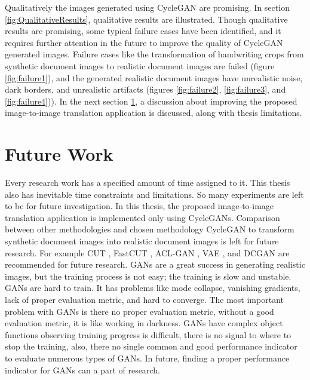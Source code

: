 Qualitatively the images generated using \ac{CycleGAN} are promising. In section \ref{fig:QualitativeResults}, qualitative results are illustrated. Though qualitative results are promising, some typical failure cases have been identified, and it requires further attention in the future to improve the quality of \ac{CycleGAN} generated images. Failure cases like the transformation of handwriting crops from synthetic document images to realistic document images are failed (figure \ref{fig:failure1}), and the generated realistic document images have unrealistic noise, dark borders, and unrealistic artifacts (figures \ref{fig:failure2}, \ref{fig:failure3}, and \ref{fig:failure4})). In the next section \ref{FutureWork}, a discussion about improving the proposed image-to-image translation application is discussed, along with thesis limitations.


\section{Future Work}\label{FutureWork}

Every research work has a specified amount of time assigned to it. This thesis also has inevitable time constraints and limitations. So many experiments are left to be for future investigation. In this thesis, the proposed image-to-image translation application is implemented only using \acp{CycleGAN}. Comparison between other methodologies and chosen methodology \ac{CycleGAN} to transform synthetic document images into realistic document images is left for future research. For example \ac{CUT} \cite{park2020contrastive}, \ac{FastCUT} \cite{park2020contrastive}, \ac{ACL-GAN} \cite{zhao2021unpaired}, \ac{VAE} \cite{Kingma_2019}, and \ac{DCGAN} \cite{radford2016unsupervised} are recommended for future research. \acp{GAN} are a great success in generating realistic images, but the training process is not easy; the training is slow and unstable. \acp{GAN} are hard to train. It has problems like mode collapse, vanishing gradients, lack of proper evaluation metric, and hard to converge. The most important problem with \acp{GAN} is there no proper evaluation metric, without a good evaluation metric, it is like working in darkness. \acp{GAN} have complex object functions observing training progress is difficult, there is no signal to where to stop the training, also, there no single common and good performance indicator to evaluate numerous types of \acp{GAN}. In future, finding a proper performance indicator for \acp{GAN} can a part of research. 

